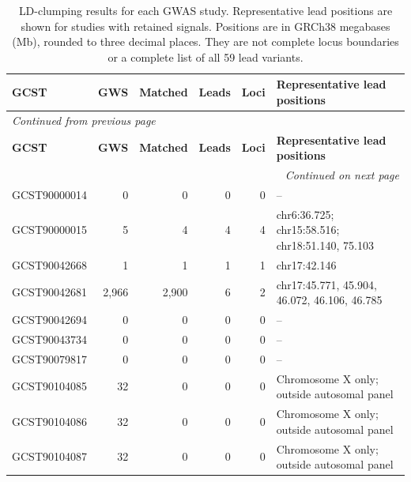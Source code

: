 \documentclass[11pt,a4paper]{article}
\begin{document}
\begin{longtable}{@{}lrrrrp{5.6cm}@{}}
\caption{LD-clumping results for each GWAS study.
Representative lead positions are shown for studies
with retained signals. Positions are in GRCh38
megabases (Mb), rounded to three decimal places.
They are not complete locus boundaries or a
complete list of all 59 lead variants.}
\label{tab:gwas_clumping_results}\\

\toprule
\textbf{GCST} &
\textbf{GWS} &
\textbf{Matched} &
\textbf{Leads} &
\textbf{Loci} &
\textbf{Representative lead positions} \\
\midrule
\endfirsthead

\multicolumn{6}{l}{
\textit{Continued from previous page}
}\\
\toprule
\textbf{GCST} &
\textbf{GWS} &
\textbf{Matched} &
\textbf{Leads} &
\textbf{Loci} &
\textbf{Representative lead positions} \\
\midrule
\endhead

\midrule
\multicolumn{6}{r}{\textit{Continued on next page}}\\
\endfoot
\bottomrule
\endlastfoot

GCST90000014 &
0 & 0 & 0 & 0 &
-- \\

GCST90000015 &
5 & 4 & 4 & 4 &
chr6:36.725;
chr15:58.516;
chr18:51.140, 75.103 \\

GCST90042668 &
1 & 1 & 1 & 1 &
chr17:42.146 \\

GCST90042681 &
2,966 & 2,900 & 6 & 2 &
chr17:45.771, 45.904, 46.072, 46.106, 46.785 \\

GCST90042694 &
0 & 0 & 0 & 0 &
-- \\

GCST90043734 &
0 & 0 & 0 & 0 &
-- \\

GCST90079817 &
0 & 0 & 0 & 0 &
-- \\

GCST90104085 &
32 & 0 & 0 & 0 &
Chromosome X only; outside autosomal panel \\

GCST90104086 &
32 & 0 & 0 & 0 &
Chromosome X only; outside autosomal panel \\

GCST90104087 &
32 & 0 & 0 & 0 &
Chromosome X only; outside autosomal panel \\


\end{longtable}
\end{document}
